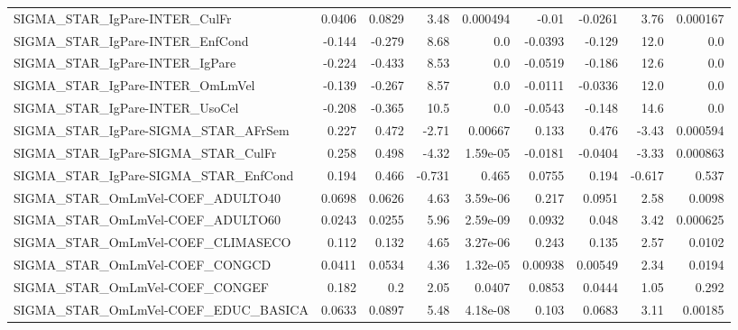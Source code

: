 \begin{tabular}{lrrrrrrrr}
SIGMA\_STAR\_IgPare-INTER\_CulFr         &      0.0406 &       0.0829 &    3.48 & 0.000494 &      -0.01 &     -0.0261 &         3.76 &      0.000167 \\
SIGMA\_STAR\_IgPare-INTER\_EnfCond       &      -0.144 &       -0.279 &    8.68 &      0.0 &    -0.0393 &      -0.129 &         12.0 &           0.0 \\
SIGMA\_STAR\_IgPare-INTER\_IgPare        &      -0.224 &       -0.433 &    8.53 &      0.0 &    -0.0519 &      -0.186 &         12.6 &           0.0 \\
SIGMA\_STAR\_IgPare-INTER\_OmLmVel       &      -0.139 &       -0.267 &    8.57 &      0.0 &    -0.0111 &     -0.0336 &         12.0 &           0.0 \\
SIGMA\_STAR\_IgPare-INTER\_UsoCel        &      -0.208 &       -0.365 &    10.5 &      0.0 &    -0.0543 &      -0.148 &         14.6 &           0.0 \\
SIGMA\_STAR\_IgPare-SIGMA\_STAR\_AFrSem   &       0.227 &        0.472 &   -2.71 &  0.00667 &      0.133 &       0.476 &        -3.43 &      0.000594 \\
SIGMA\_STAR\_IgPare-SIGMA\_STAR\_CulFr    &       0.258 &        0.498 &   -4.32 & 1.59e-05 &    -0.0181 &     -0.0404 &        -3.33 &      0.000863 \\
SIGMA\_STAR\_IgPare-SIGMA\_STAR\_EnfCond  &       0.194 &        0.466 &  -0.731 &    0.465 &     0.0755 &       0.194 &       -0.617 &         0.537 \\
SIGMA\_STAR\_OmLmVel-COEF\_ADULTO40      &      0.0698 &       0.0626 &    4.63 & 3.59e-06 &      0.217 &      0.0951 &         2.58 &        0.0098 \\
SIGMA\_STAR\_OmLmVel-COEF\_ADULTO60      &      0.0243 &       0.0255 &    5.96 & 2.59e-09 &     0.0932 &       0.048 &         3.42 &      0.000625 \\
SIGMA\_STAR\_OmLmVel-COEF\_CLIMASECO     &       0.112 &        0.132 &    4.65 & 3.27e-06 &      0.243 &       0.135 &         2.57 &        0.0102 \\
SIGMA\_STAR\_OmLmVel-COEF\_CONGCD        &      0.0411 &       0.0534 &    4.36 & 1.32e-05 &    0.00938 &     0.00549 &         2.34 &        0.0194 \\
SIGMA\_STAR\_OmLmVel-COEF\_CONGEF        &       0.182 &          0.2 &    2.05 &   0.0407 &     0.0853 &      0.0444 &         1.05 &         0.292 \\
SIGMA\_STAR\_OmLmVel-COEF\_EDUC\_BASICA   &      0.0633 &       0.0897 &    5.48 & 4.18e-08 &      0.103 &      0.0683 &         3.11 &       0.00185 \\

\end{tabular}
